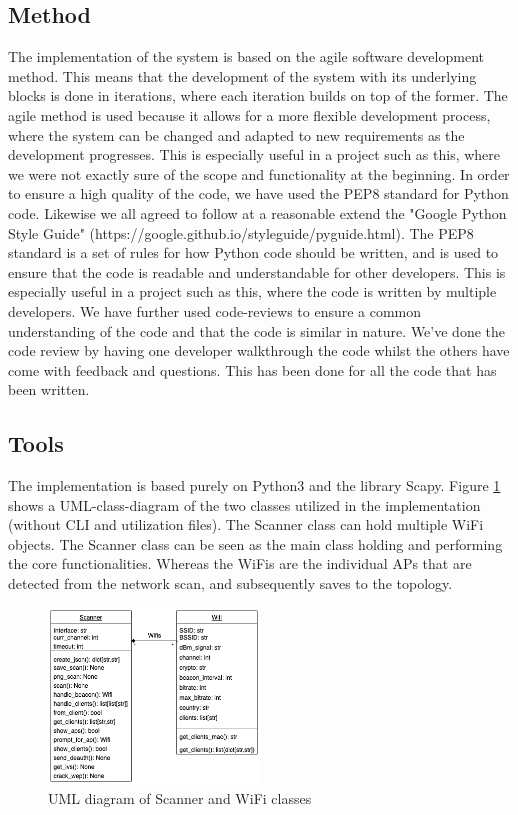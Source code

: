 \subsection{Method}
The implementation of the system is based on the agile software development method. This means that the development of the system with its underlying blocks is done in iterations, where each iteration builds on top of the former. 
The agile method is used because it allows for a more flexible development process, where the system can be changed and adapted to new requirements as the development progresses. This is especially useful in a project such as this, where we were not exactly sure of the scope and functionality at the beginning.
In order to ensure a high quality of the code, we have used the PEP8 standard for Python code. Likewise we all agreed to follow at a reasonable extend the "Google Python Style Guide" (https://google.github.io/styleguide/pyguide.html). The PEP8 standard is a set of rules for how Python code should be written, and is used to ensure that the code is readable and understandable for other developers. This is especially useful in a project such as this, where the code is written by multiple developers.
We have further used code-reviews to ensure a common understanding of the code and that the code is similar in nature. We've done the code review by having one developer walkthrough the code whilst the others have come with feedback and questions. This has been done for all the code that has been written. 



\subsection{Tools}
The implementation is based purely on Python3 and the library Scapy. Figure \ref{UML_diagram} shows a UML-class-diagram of the two classes utilized in the implementation (without CLI and utilization files). The Scanner class can hold multiple WiFi objects. The Scanner class can be seen as the main class holding and performing the core functionalities. Whereas the WiFis are the individual APs that are detected from the network scan, and subsequently saves to the topology.
\begin{figure}[!htbp]
    \centering
    \includegraphics[width=0.5\textwidth]{Latex-Files/Billeder/Flowcharts/classes.png}
    \caption{UML diagram of Scanner and WiFi classes}
    \label{UML_diagram}
\end{figure}
